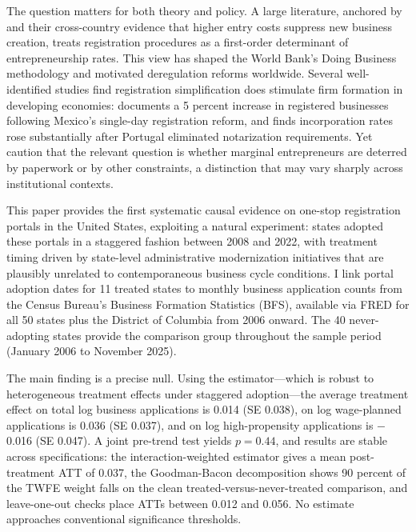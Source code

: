 \documentclass[12pt]{article}
\begin{document}
The question matters for both theory and policy. A large literature, anchored by \citet{djankov2002regulation} and their cross-country evidence that higher entry costs suppress new business creation, treats registration procedures as a first-order determinant of entrepreneurship rates. This view has shaped the World Bank's Doing Business methodology and motivated deregulation reforms worldwide. Several well-identified studies find registration simplification does stimulate firm formation in developing economies: \citet{bruhn2011} documents a 5 percent increase in registered businesses following Mexico's single-day registration reform, and \citet{branstetter2014} finds incorporation rates rose substantially after Portugal eliminated notarization requirements. Yet \citet{klapper2006} caution that the relevant question is whether marginal entrepreneurs are deterred by paperwork or by other constraints, a distinction that may vary sharply across institutional contexts.

This paper provides the first systematic causal evidence on one-stop registration portals in the United States, exploiting a natural experiment: states adopted these portals in a staggered fashion between 2008 and 2022, with treatment timing driven by state-level administrative modernization initiatives that are plausibly unrelated to contemporaneous business cycle conditions. I link portal adoption dates for 11 treated states to monthly business application counts from the Census Bureau's Business Formation Statistics (BFS), available via FRED for all 50 states plus the District of Columbia from 2006 onward. The 40 never-adopting states provide the comparison group throughout the sample period (January 2006 to November 2025).

The main finding is a precise null. Using the \citet{callaway2021} estimator---which is robust to heterogeneous treatment effects under staggered adoption---the average treatment effect on total log business applications is 0.014 (SE 0.038), on log wage-planned applications is 0.036 (SE 0.037), and on log high-propensity applications is $-$0.016 (SE 0.047). A joint pre-trend test yields $p = 0.44$, and results are stable across specifications: the \citet{sun2021} interaction-weighted estimator gives a mean post-treatment ATT of 0.037, the Goodman-Bacon decomposition shows 90 percent of the TWFE weight falls on the clean treated-versus-never-treated comparison, and leave-one-out checks place ATTs between 0.012 and 0.056. No estimate approaches conventional significance thresholds.
\end{document}
